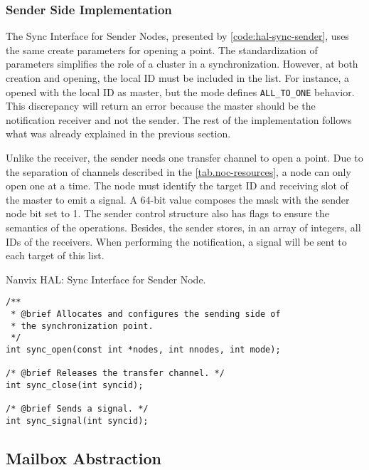 			\subsubsection{Sender Side Implementation}

				The Sync Interface for Sender Nodes, presented by
				\autoref{code:hal-sync-sender}, uses the same create parameters for
				opening a \sync point. The standardization of parameters simplifies
				the role of a cluster in a synchronization. However, at both creation
				and opening, the local ID must be included in the list. For instance,
				a \sync opened with the local ID as master, but the mode defines
				\texttt{ALL\_TO\_ONE} behavior. This discrepancy will return an error
				because the master should be the notification receiver and not the
				sender. The rest of the implementation follows what was already
				explained in the previous section.

				Unlike the receiver, the sender needs one \cnoc transfer channel to
				open a \sync point. Due to the separation of channels described in
				the \autoref{tab.noc-resources}, a node can only open one \sync at
				a time. The node must identify the target ID and receiving slot of
				the master to emit a signal. A 64-bit value composes the mask with
				the sender node bit set to 1. The sender control structure also has
				flags to ensure the semantics of the operations. Besides, the sender
				stores, in an array of integers, all IDs of the receivers. When
				performing the notification, a signal will be sent to each target
				of this list.

\begin{listing}[!tb]
\caption{Nanvix HAL: Sync Interface for Sender Node.}
\label{code:hal-sync-sender}
\begin{verbatim}
/**
 * @brief Allocates and configures the sending side of
 * the synchronization point.
 */
int sync_open(const int *nodes, int nnodes, int mode);

/* @brief Releases the transfer channel. */
int sync_close(int syncid);

/* @brief Sends a signal. */
int sync_signal(int syncid);
\end{verbatim}
\end{listing}

		\subsection{Mailbox Abstraction}
		\label{sec.mailbox-abs}


